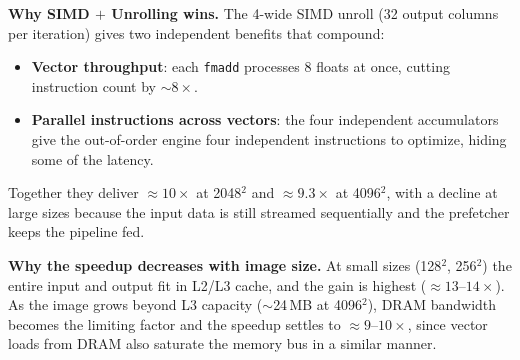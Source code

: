 \documentclass[11pt]{article}
\begin{document}
\textbf{Why SIMD $+$ Unrolling wins.}
The 4-wide SIMD unroll (32 output columns per iteration) gives two independent
benefits that compound:
\begin{itemize}[leftmargin=1.4em, itemsep=0.2em]
    \item \textbf{Vector throughput}: each \texttt{fmadd} processes 8 floats
    at once, cutting instruction count by $\sim 8\times$.
    \item \textbf{Parallel instructions across vectors}: the four independent accumulators give
    the out-of-order engine four independent instructions to optimize, hiding some of the latency.
\end{itemize}
Together they deliver $\approx 10\times$ at 2048$^2$ and $\approx 9.3\times$
at 4096$^2$, with a decline at large sizes because the input data is
still streamed sequentially and the prefetcher keeps the pipeline fed.

\textbf{Why the speedup decreases with image size.}
At small sizes (128$^2$, 256$^2$) the entire input and output fit in L2/L3
cache, and the gain is highest ($\approx 13$--$14\times$). As the image grows beyond L3 capacity
($\sim$24\,MB at 4096$^2$), DRAM bandwidth becomes the limiting factor and
the speedup settles to $\approx 9$--$10\times$, since vector loads from DRAM also
saturate the memory bus in a similar manner.
\end{document}
